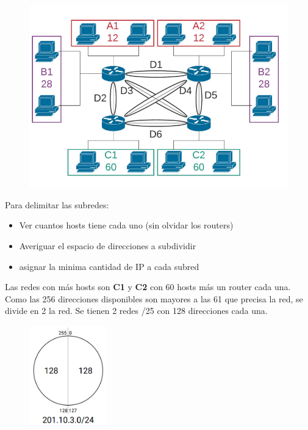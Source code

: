 \begin{figure}[H]
\centering
\includegraphics[width=\textwidth]{imagenes/subnetting12.png}
\end{figure}

Para delimitar las subredes:

\begin{itemize}
    \item Ver cuantos hosts tiene cada uno (sin olvidar los routers)
    \item Averiguar el espacio de direcciones a subdividir
    \item asignar la minima cantidad de IP a cada subred
\end{itemize}

Las redes con más hosts son \textbf{C1} y \textbf{C2} con 60 hosts más un router cada una. Como las 256 direcciones disponibles son mayores a las 61 que precisa la red, se divide en 2 la red. Se tienen 2 redes /25 con 128 direcciones cada una.

\begin{figure}[H]
\centering
\includegraphics[width=0.3\textwidth]{imagenes/subnetting13.png}
\end{figure}


